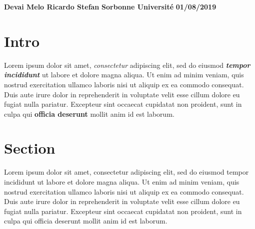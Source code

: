 \documentclass[12pt]{article}
\begin{document}
\begin{flushright}
  \textbf{Devai Melo Ricardo Stefan}
  \linebreak
  \textbf{Sorbonne Université}
  \linebreak
  \textbf{01/08/2019}
  \linebreak
\end{flushright}


\section*{Intro}
Lorem ipsum dolor sit amet, \emph{consectetur} adipiscing elit, sed do eiusmod \emph{\textbf{tempor incididunt}} ut labore et dolore magna aliqua. Ut enim ad minim veniam, quis nostrud exercitation ullamco laboris nisi ut aliquip ex ea commodo consequat. Duis aute irure dolor in reprehenderit in voluptate velit esse cillum dolore eu fugiat nulla pariatur. Excepteur sint occaecat cupidatat non proident, sunt in culpa qui \textbf{officia deserunt} mollit anim id est laborum.

\section*{Section}
Lorem ipsum dolor sit amet, consectetur adipiscing elit, sed do eiusmod tempor incididunt ut labore et dolore magna aliqua. Ut enim ad minim veniam, quis nostrud exercitation ullamco laboris nisi ut aliquip ex ea commodo consequat. Duis aute irure dolor in reprehenderit in voluptate velit esse cillum dolore eu fugiat nulla pariatur. Excepteur sint occaecat cupidatat non proident, sunt in culpa qui officia deserunt mollit anim id est laborum.
\end{document}
